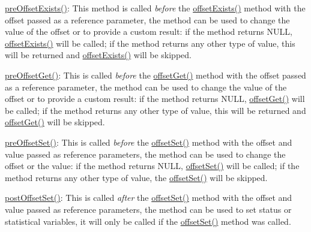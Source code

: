 \begin{DoxyItemize}
\item {\ttfamily \hyperlink{class_ontology_wrapper_1_1_container_object_ae03602f378081e220f8e6280d75bdc3e}{pre\-Offset\-Exists()}}\-: This method is called {\itshape before} the \hyperlink{class_ontology_wrapper_1_1_container_object_aff6fe69abda5124438458b687ab30c4f}{offset\-Exists()} method with the offset passed as a reference parameter, the method can be used to change the value of the offset or to provide a custom result\-: if the method returns {\ttfamily N\-U\-L\-L}, \hyperlink{class_ontology_wrapper_1_1_container_object_aff6fe69abda5124438458b687ab30c4f}{offset\-Exists()} will be called; if the method returns any other type of value, this will be returned and \hyperlink{class_ontology_wrapper_1_1_container_object_aff6fe69abda5124438458b687ab30c4f}{offset\-Exists()} will be skipped. 
\item {\ttfamily \hyperlink{class_ontology_wrapper_1_1_container_object_a7053dffd7fc10440eebfecd74e73d4af}{pre\-Offset\-Get()}}\-: This is called {\itshape before} the \hyperlink{class_ontology_wrapper_1_1_container_object_a1fcd9bbec807c35973f634eb0a98ae13}{offset\-Get()} method with the offset passed as a reference parameter, the method can be used to change the value of the offset or to provide a custom result\-: if the method returns {\ttfamily N\-U\-L\-L}, \hyperlink{class_ontology_wrapper_1_1_container_object_a1fcd9bbec807c35973f634eb0a98ae13}{offset\-Get()} will be called; if the method returns any other type of value, this will be returned and \hyperlink{class_ontology_wrapper_1_1_container_object_a1fcd9bbec807c35973f634eb0a98ae13}{offset\-Get()} will be skipped. 
\item {\ttfamily \hyperlink{class_ontology_wrapper_1_1_container_object_ab7d07dda2c4b88ffa98b41d48814d03f}{pre\-Offset\-Set()}}\-: This is called {\itshape before} the \hyperlink{class_ontology_wrapper_1_1_container_object_ae7c3dbc16f8e0e2bbd667c0168539a3e}{offset\-Set()} method with the offset and value passed as reference parameters, the method can be used to change the offset or the value\-: if the method returns {\ttfamily N\-U\-L\-L}, \hyperlink{class_ontology_wrapper_1_1_container_object_ae7c3dbc16f8e0e2bbd667c0168539a3e}{offset\-Set()} will be called; if the method returns any other type of value, the \hyperlink{class_ontology_wrapper_1_1_container_object_ae7c3dbc16f8e0e2bbd667c0168539a3e}{offset\-Set()} will be skipped. 
\item {\ttfamily \hyperlink{class_ontology_wrapper_1_1_container_object_a0fa0ab4b7e742d00f2daa9206aa0b44a}{post\-Offset\-Set()}}\-: This is called {\itshape after} the \hyperlink{class_ontology_wrapper_1_1_container_object_ae7c3dbc16f8e0e2bbd667c0168539a3e}{offset\-Set()} method with the offset and value passed as reference parameters, the method can be used to set status or statistical variables, it will only be called if the \hyperlink{class_ontology_wrapper_1_1_container_object_ae7c3dbc16f8e0e2bbd667c0168539a3e}{offset\-Set()} method was called. 

\end{DoxyItemize}

